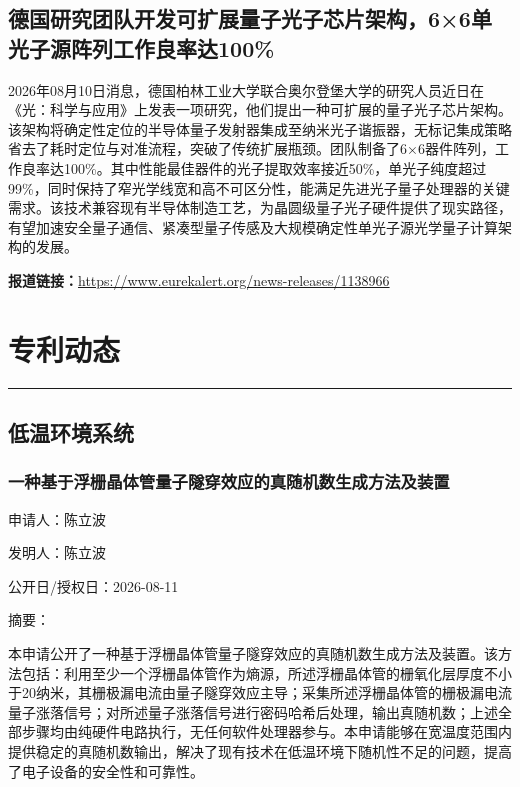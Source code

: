 \documentclass[12pt,a4paper]{ctexart}
\begin{document}
\subsection{ 德国研究团队开发可扩展量子光子芯片架构，6×6单光子源阵列工作良率达100\% }

2026年08月10日消息，德国柏林工业大学联合奥尔登堡大学的研究人员近日在《光：科学与应用》上发表一项研究，他们提出一种可扩展的量子光子芯片架构。该架构将确定性定位的半导体量子发射器集成至纳米光子谐振器，无标记集成策略省去了耗时定位与对准流程，突破了传统扩展瓶颈。团队制备了6×6器件阵列，工作良率达100\%。其中性能最佳器件的光子提取效率接近50\%，单光子纯度超过99\%，同时保持了窄光学线宽和高不可区分性，能满足先进光子量子处理器的关键需求。该技术兼容现有半导体制造工艺，为晶圆级量子光子硬件提供了现实路径，有望加速安全量子通信、紧凑型量子传感及大规模确定性单光子源光学量子计算架构的发展。

\noindent\textbf{报道链接：}\url{https://www.eurekalert.org/news-releases/1138966}



\newpage
\section{专利动态}
\vspace{-0.5em}
\noindent\rule{\linewidth}{1.5pt}

\subsection{ 低温环境系统 }

\subsubsection{ 一种基于浮栅晶体管量子隧穿效应的真随机数生成方法及装置 }

申请人：陈立波

发明人：陈立波

公开日/授权日：2026-08-11

摘要：

本申请公开了一种基于浮栅晶体管量子隧穿效应的真随机数生成方法及装置。该方法包括：利用至少一个浮栅晶体管作为熵源，所述浮栅晶体管的栅氧化层厚度不小于20纳米，其栅极漏电流由量子隧穿效应主导；采集所述浮栅晶体管的栅极漏电流量子涨落信号；对所述量子涨落信号进行密码哈希后处理，输出真随机数；上述全部步骤均由纯硬件电路执行，无任何软件处理器参与。本申请能够在宽温度范围内提供稳定的真随机数输出，解决了现有技术在低温环境下随机性不足的问题，提高了电子设备的安全性和可靠性。
\end{document}
